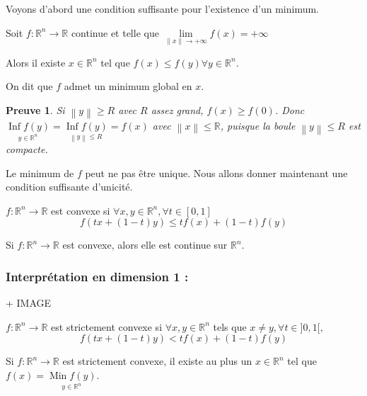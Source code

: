 \documentclass[a4paper,11pt]{article}
\newcommand{\R}{\mathbb{R}}
\newcommand{\norm}[1]{\left\lVert#1\right\rVert}
\newcommand{\deffonc}[3]{#1 : #2 \longrightarrow #3}
\DeclareMathOperator{\Min}{Min}
\DeclareMathOperator{\Inf}{Inf}
\theoremstyle{plain} %
\newtheorem{preuve}{Preuve}
\begin{document}
Voyons d'abord une condition suffisante pour l'existence d'un minimum.

\begin{ftheo}
    Soit $\deffonc{f}{\R^n}{\R}$ continue et telle que $\underset{\norm{x} \to +\infty}{\lim} f(x) = + \infty$

    Alors il existe $x \in \R^n$ tel que $f(x) \leq f(y) \forall y \in \R^n$.
\end{ftheo}

\begin{remark}
    On dit que $f$ admet un minimum global en $x$.
\end{remark}

\begin{preuve}
    Si $\norm{y} \geq R$ avec $R$ assez grand, $f(x) \geq f(0)$.
    Donc $\underset{y \in \R^n}{\Inf f(y)} = \underset{\norm{y} \leq R}{\Inf f(y)} = f(x)$ avec $\norm{x} \leq \R$, puisque la boule $\norm{y} \leq R$ est compacte.
\end{preuve}

Le minimum de $f$ peut ne pas être unique. Nous allons donner maintenant une condition
suffisante d'unicité.

\begin{fdef}
    $\deffonc{f}{\R^n}{\R}$ est convexe si $\forall x,y \in \R^n, \forall t \in [0,1]$
    \[
        f(tx + (1-t)y) \leq tf(x) + (1-t)f(y)
    \]
\end{fdef}

\begin{remark}
    Si $\deffonc{f}{\R^n}{\R}$ est convexe, alors elle est continue sur $\R^n$.
\end{remark}

\subsubsection*{Interprétation en dimension 1 :}
+ IMAGE


\begin{fdef}
    $\deffonc{f}{\R^n}{\R}$ est strictement convexe si $\forall x,y \in \R^n$ tels
que $x \ne y, \forall t \in ]0,1[,$
    \[
        f(tx + (1-t)y) < tf(x) + (1-t) f(y)
    \]
\end{fdef}

\begin{ftheo}
    Si $\deffonc{f}{\R^n}{\R}$ est strictement convexe, il existe au plus un
    $x \in \R^n$ tel que $f(x) = \underset{y\in \R^n}{\Min f(y)}$.
\end{ftheo}
\end{document}
